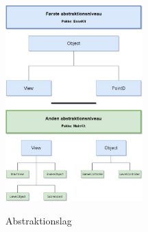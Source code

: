 \documentclass[]{article}
\begin{document}
\begin{figure}[h!]
	\centering
	\includegraphics[width=200px]{Abstraktions_diagram.jpg}
	\label{fig:diagram}
	\caption{Abstraktionslag}
\end{figure}
\end{document}
